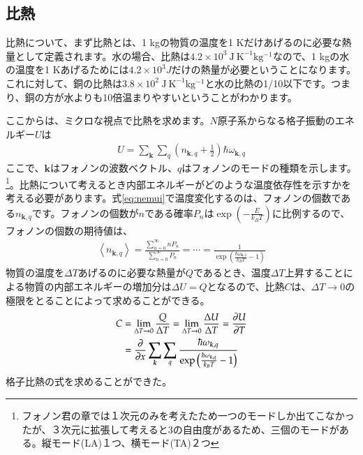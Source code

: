 \documentclass[10pt,b5paper,papersize,dvipdfmx]{jsbook}
\begin{document}
\subsection{比熱}
比熱について、まず比熱とは、1 kgの物質の温度を1 Kだけあげるのに必要な熱量として定義されます。水の場合、比熱は$4.2 \times 10^3\  \mathrm{J\ K ^{-1} kg^{-1}}$なので、1 kgの水の温度を1 Kあげるためには$4.2 \times 10^3 J$だけの熱量が必要ということになります。これに対して、銅の比熱は$3.8 \times 10^2\ \mathrm{J\ K ^{-1} kg^{-1}}$と水の比熱の1/10以下です。つまり、銅の方が水よりも10倍温まりやすいということがわかります。\par
ここからは、ミクロな視点で比熱を求めます。$N$原子系からなる格子振動のエネルギー$U$は
\begin{align}
  U = \sum_{\bm{k}}\sum_{q}\left(n_{\bm{k},q} + \frac{1}{2}\right)\hbar \omega_{\bm{k},q}
  \label{eq:nemui}
\end{align}
ここで、$\bm{k}$はフォノンの波数ベクトル、$q$はフォノンのモードの種類を示します。\footnote{フォノン君の章では１次元のみを考えたため一つのモードしか出てこなかったが、３次元に拡張して考えると3の自由度があるため、三個のモードがある。縦モード(LA)１つ、横モード(TA)２つ}。比熱について考えるとき内部エネルギーがどのような温度依存性を示すかを考える必要があります。式\ref{eq:nemui}で温度変化するのは、フォノンの個数である$n_{\bm{k},q}$です。フォノンの個数が$n$である確率$P_n$は$\exp\left(-\frac{E}{k_BT}\right)$に比例するので、フォノンの個数の期待値は、
\begin{align}
  \left\langle n_{\bm{k},q}\right\rangle = \frac{\sum_{n = 0}^\infty nP_n}{\sum_{n = 0}^\infty P_n} = \cdots = \frac{1}{\exp \left(\frac{\hbar \omega_{\bm{k}, q}}{k_BT}-1\right)}
\end{align}
物質の温度を$\Delta T$あげるのに必要な熱量が$Q$であるとき、温度$\Delta T$上昇することによる物質の内部エネルギーの増加分は$\Delta U = Q$となるので、比熱$C$は、$\Delta T \rightarrow 0$の極限をとることによって求めることができる。
\begin{align}
  C &= \lim_{\Delta T \rightarrow 0} \frac{Q}{\Delta T} = \lim_{\Delta T \rightarrow 0} \frac{\Delta U}{\Delta T} = \pdv{U}{T}\\
    &= \pdv{x} \sum_{\bm{k}}\sum_{q}\frac{\hbar \omega_{\bm{k},q}}{\exp\left(\frac{\hbar \omega_{\bm{k},q}}{k_BT}-1\right)}
\label{eq:totemonemutai}
\end{align}
格子比熱の式を求めることができた。
\end{document}
